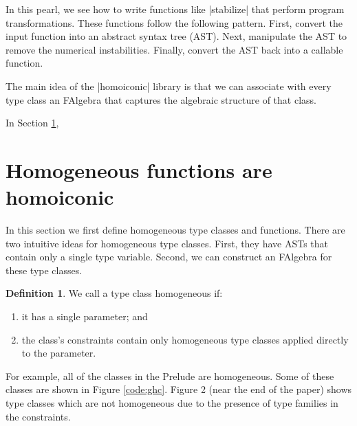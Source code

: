 \documentclass[preprint]{sigplanconf}
\theoremstyle{definition}
\newtheorem{defn}{Definition}
\begin{document}
In this pearl, we see how to write functions like |stabilize| that perform program transformations.
These functions follow the following pattern.
First, convert the input function into an abstract syntax tree (AST).
Next, manipulate the AST to remove the numerical instabilities.
Finally, convert the AST back into a callable function.

The main idea of the |homoiconic| library is that we can associate with every type class an FAlgebra that captures the algebraic structure of that class.

In Section \ref{sec:homogeneous},

\section{Homogeneous functions are homoiconic}
\label{sec:homogeneous}

In this section we first define homogeneous type classes and functions.
There are two intuitive ideas for homogeneous type classes.
First, they have ASTs that contain only a single type variable.
Second, we can construct an FAlgebra for these type classes.

\begin{defn}
We call a type class homogeneous if:
\begin{enumerate}
\item
it has a single parameter; and
\item
the class's constraints contain only homogeneous type classes applied directly to the parameter.
\end{enumerate}
For example, all of the classes in the Prelude are homogeneous.
Some of these classes are shown in Figure \ref{code:ghc}.
Figure 2 (near the end of the paper) shows type classes which are not homogeneous due to the presence of type families in the constraints.
\end{defn}
\end{document}
